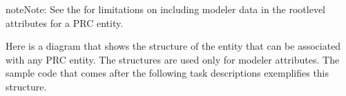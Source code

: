 \documentclass[letterpaper,12pt,english,openany,oneside]{sphinxmanual}
\begin{document}
\begin{sphinxadmonition}{note}{Note:}
See the  for limitations on including modeler data in the root\sphinxhyphen{}level attributes for a PRC entity.
\end{sphinxadmonition}

Here is a diagram that shows the structure of the  entity that can be associated with any PRC entity. The  structures are used only for modeler attributes. The sample code that comes after the following task descriptions exemplifies this structure.

\noindent{}
\end{document}
